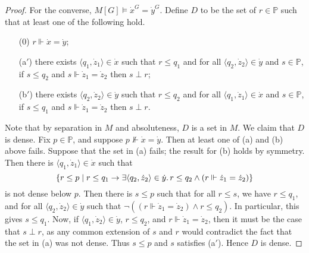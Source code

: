 \begin{proof}
    For the converse, \( M[G] \vDash \dot x^G = \dot y^G \).
    Define \( D \) to be the set of \( r \in \mathbb P \) such that at least one of the following hold.
    \begin{enumerate}
        \item[(0)] \( r \Vdash \dot x = \dot y \);
        \item[(a\( ' \))] there exists \( \langle q_1, \dot z_1 \rangle \in \dot x \) such that \( r \leq q_1 \) and for all \( \langle q_2, \dot z_2 \rangle \in \dot y \) and \( s \in \mathbb P \), if \( s \leq q_2 \) and \( s \Vdash \dot z_1 = \dot z_2 \) then \( s \perp r \);
        \item[(b\( ' \))] there exists \( \langle q_2, \dot z_2 \rangle \in \dot y \) such that \( r \leq q_2 \) and for all \( \langle q_1, \dot z_1 \rangle \in \dot x \) and \( s \in \mathbb P \), if \( s \leq q_1 \) and \( s \Vdash \dot z_1 = \dot z_2 \) then \( s \perp r \).
    \end{enumerate}
    Note that by separation in \( M \) and absoluteness, \( D \) is a set in \( M \).
    We claim that \( D \) is dense.
    Fix \( p \in \mathbb P \), and suppose \( p \nVdash \dot x = \dot y \).
    Then at least one of (a) and (b) above fails.
    Suppose that the set in (a) fails; the result for (b) holds by symmetry.
    Then there is \( \langle q_1, \dot z_1 \rangle \in \dot x \) such that
    \[ \qty{r \leq p \mid r \leq q_1 \to \exists \langle q_2, \dot z_2 \rangle \in \dot y.\, r \leq q_2 \wedge (r \Vdash \dot z_1 = \dot z_2)} \]
    is not dense below \( p \).
    Then there is \( s \leq p \) such that for all \( r \leq s \), we have \( r \leq q_1 \), and for all \( \langle q_2, \dot z_2 \rangle \in \dot y \) such that \( \neg((r \Vdash \dot z_1 = \dot z_2) \wedge r \leq q_2) \).
    In particular, this gives \( s \leq q_1 \).
    Now, if \( \langle q_1, \dot z_2 \rangle \in \dot y \), \( r \leq q_2 \), and \( r \Vdash \dot z_1 = \dot z_2 \), then it must be the case that \( s \perp r \), as any common extension of \( s \) and \( r \) would contradict the fact that the set in (a) was not dense.
    Thus \( s \leq p \) and \( s \) satisfies (a\( ' \)).
    Hence \( D \) is dense.


\end{proof}
